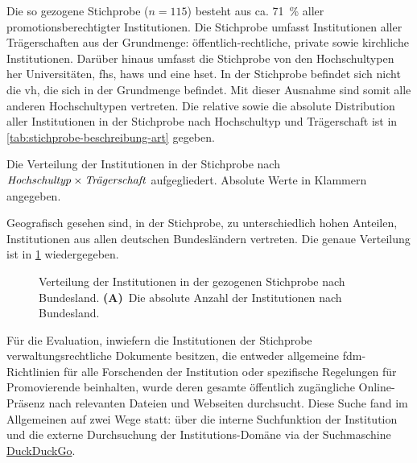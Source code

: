 Die so gezogene Stichprobe ($n=115$) besteht aus ca. \SI{71}{\percent} aller promotionsberechtigter Institutionen.
Die Stichprobe umfasst Institutionen aller Trägerschaften aus der Grundmenge: öffentlich-rechtliche, private sowie kirchliche Institutionen.
Darüber hinaus umfasst die Stichprobe von den Hochschultypen her Universitäten, \glspl{fh}, \glspl{haw} und eine \gls{hset}.
In der Stichprobe befindet sich nicht die \gls{vh}, die sich in der Grundmenge befindet.
Mit dieser Ausnahme sind somit alle anderen Hochschultypen vertreten.
Die relative sowie die absolute Distribution aller Institutionen in der Stichprobe nach Hochschultyp und Trägerschaft ist in \cref{tab:stichprobe-beschreibung-art} gegeben.
\begin{table}[!htbp]
	\caption{Die Verteilung der Institutionen in der Stichprobe nach $\text{\textit{Hochschultyp}}\times\text{\textit{Trägerschaft}}$ aufgegliedert. Absolute Werte in Klammern angegeben.}
    
	\label{tab:stichprobe-beschreibung-art}
\end{table}

\noindent Geografisch gesehen sind, in der Stichprobe, zu unterschiedlich hohen Anteilen, Institutionen aus allen deutschen Bundesländern vertreten.
Die genaue Verteilung ist in \cref{fig:DE-stichprobe-beschreibung} wiedergegeben.
\begin{figure}[!htbp]
    \centering
    
    \caption{Verteilung der Institutionen in der gezogenen Stichprobe nach Bundesland. \textbf{(A)}~Die absolute Anzahl der Institutionen nach Bundesland. }
    \label{fig:DE-stichprobe-beschreibung}
\end{figure}

Für die Evaluation, inwiefern die Institutionen der Stichprobe verwaltungsrechtliche Dokumente besitzen, die entweder allgemeine \gls{fdm}-Richtlinien für alle Forschenden der Institution oder spezifische Regelungen für Promovierende beinhalten, wurde deren gesamte öffentlich zugängliche Online-Präsenz nach relevanten Dateien und Webseiten durchsucht.
Diese Suche fand im Allgemeinen auf zwei Wege statt: über die interne Suchfunktion der Institution und die externe Durchsuchung der Institutions-Domäne via der Suchmaschine \href{https://www.duckduckgo.com/}{DuckDuckGo}.

